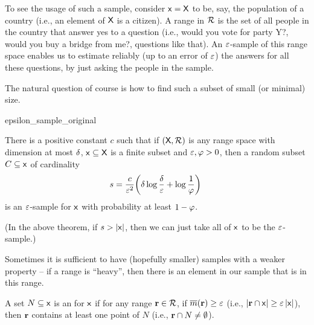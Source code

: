 To see the usage of such a sample, consider $\mathsf{x} = \textsf{X}$
to be, say, the population of a country (i.e., an element of
$\textsf{X}$ is a citizen). A range in ${\mathcal{R}}$ is the set of all
people in the country that answer yes to a question (i.e., would you
vote for party Y?, would you buy a bridge from me?, questions like
that). An ${\varepsilon}$-sample of this range space enables us to estimate
reliably (up to an error of ${\varepsilon}$) the answers for all these
questions, by just asking the people in the sample.

The natural question of course is how to find such a subset of small
(or minimal) size.

\begin{fragment}{epsilon_sample_original}
    \begin{theorem}
        There is a positive co\-nstant 
        $c$ such that if
        $(\textsf{X},{\mathcal{R}})$ is any range space with \VC dimension
        at most $\delta$, $\mathsf{x} \subseteq \textsf{X}$ is a finite
        subset and ${\varepsilon}, \varphi > 0$, then a random subset
        $C\subseteq \mathsf{x}$ of cardinality
        \begin{align*}
          s = \frac{c}{\eps^2} \pth{ \Dim \log \frac{\Dim}{\eps} +
          \log\frac{1}{\BadProb}}\
        \end{align*}
        is an ${\varepsilon}$-sample for $\mathsf{x}$ with probability at
        least $1-\varphi$.                
    \end{theorem}
\end{fragment}

(In the above theorem, if $s > \left| {\mathsf{x}} \right|$, then we can just
take all of $\mathsf{x}$ to be the ${\varepsilon}$-sample.)

\medskip


Sometimes it is sufficient to have (hopefully smaller) samples with a
weaker property -- if a range is ``heavy'', then there is an element in
our sample that is in this range.

\begin{defn}
    A set $N \subseteq \mathsf{x}$ is an
     for $\mathsf{x}$ if
    for any range $\mathbf{r} \in {\mathcal{R}}$, if $\Measure{\range} \geq
    \eps$ (i.e., $\left| {\mathbf{r} \cap \mathsf{x}} \right| \geq {\varepsilon}
    \left| {\mathsf{x}} \right|$), then $\mathbf{r}$ contains at least one point
    of $N$ (i.e., $\mathbf{r} \cap N \ne \emptyset$).
\end{defn}

